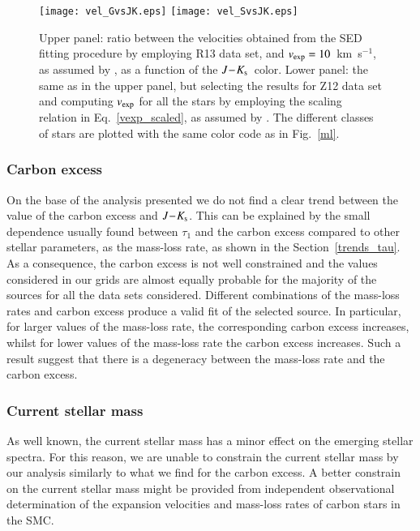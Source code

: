 \documentclass[useAMS,usenatbib]{mn2e/mn2e}
\newcommand{\jks}{\mbox{$J\!-\!K_{\rm s}$}}
\begin{document}
{            \begin{figure}
\texttt{[image: vel\_GvsJK.eps]}
\texttt{[image: vel\_SvsJK.eps]}
        \caption{Upper panel: ratio between the velocities obtained from the SED fitting procedure by employing R13 data set, and $v_{\rm exp}=10$~km~s$^{-1}$, as assumed by \citet{Groenewegen09},  as a function of the \jks\ color. Lower panel: the same as in the upper panel, but selecting the results for Z12 data set and computing $v_{\rm exp}$ for all the stars by employing the scaling relation in Eq.~\ref{vexp_scaled}, as assumed by \citet{Srinivasan16}. The different classes of stars are plotted with the same color code as in Fig.~\ref{ml}.}
        \label{vel_ratio}
        \end{figure}

\subsubsection{Carbon excess}
On the base of the analysis presented we do not find a clear trend between the value of the carbon excess and \jks. This can be explained by the small dependence usually found between $\tau_1$ and the carbon excess compared to other stellar parameters, as the mass-loss rate, as shown in the Section~\ref{trends_tau}. 
As a consequence, the carbon excess is not well constrained and the values considered in our grids are almost equally probable for the majority of the sources for all the data sets considered.
Different combinations of the mass-loss rates and carbon excess produce a valid fit of the selected source. In particular, for larger values of the mass-loss rate, the corresponding carbon excess increases, whilst for lower values of the mass-loss rate the carbon excess increases.
Such a result suggest that there is a degeneracy between the mass-loss rate and the carbon excess.

\subsubsection{Current stellar mass}
As well known, the current stellar mass has a minor effect on the emerging stellar spectra.
For this reason, we are unable to constrain the current stellar mass by our analysis similarly to what we find for the carbon excess.
A better constrain on the current stellar mass might be provided from independent observational determination of the expansion velocities and mass-loss rates of carbon stars in the SMC. 

}
\end{document}
